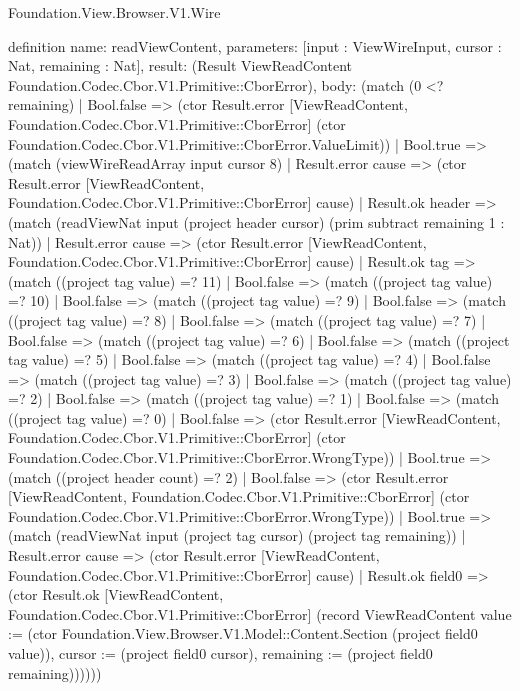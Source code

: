 \begin{lexlean}{Foundation.View.Browser.V1.Wire}
\begin{semanticmodule}
definition{
  name: readViewContent,
  parameters: [input : ViewWireInput, cursor : Nat, remaining : Nat],
  result: (Result ViewReadContent Foundation.Codec.Cbor.V1.Primitive::CborError),
  body: (match (0 <? remaining)
    | Bool.false => (ctor Result.error [ViewReadContent, Foundation.Codec.Cbor.V1.Primitive::CborError] (ctor Foundation.Codec.Cbor.V1.Primitive::CborError.ValueLimit))
    | Bool.true => (match (viewWireReadArray input cursor 8)
      | Result.error cause => (ctor Result.error [ViewReadContent, Foundation.Codec.Cbor.V1.Primitive::CborError] cause)
      | Result.ok header => (match (readViewNat input (project header cursor) (prim subtract remaining 1 : Nat))
        | Result.error cause => (ctor Result.error [ViewReadContent, Foundation.Codec.Cbor.V1.Primitive::CborError] cause)
        | Result.ok tag => (match ((project tag value) =? 11)
          | Bool.false => (match ((project tag value) =? 10)
            | Bool.false => (match ((project tag value) =? 9)
              | Bool.false => (match ((project tag value) =? 8)
                | Bool.false => (match ((project tag value) =? 7)
                  | Bool.false => (match ((project tag value) =? 6)
                    | Bool.false => (match ((project tag value) =? 5)
                      | Bool.false => (match ((project tag value) =? 4)
                        | Bool.false => (match ((project tag value) =? 3)
                          | Bool.false => (match ((project tag value) =? 2)
                            | Bool.false => (match ((project tag value) =? 1)
                              | Bool.false => (match ((project tag value) =? 0)
                                | Bool.false => (ctor Result.error [ViewReadContent, Foundation.Codec.Cbor.V1.Primitive::CborError] (ctor Foundation.Codec.Cbor.V1.Primitive::CborError.WrongType))
                                | Bool.true => (match ((project header count) =? 2)
                                  | Bool.false => (ctor Result.error [ViewReadContent, Foundation.Codec.Cbor.V1.Primitive::CborError] (ctor Foundation.Codec.Cbor.V1.Primitive::CborError.WrongType))
                                  | Bool.true => (match (readViewNat input (project tag cursor) (project tag remaining))
                                    | Result.error cause => (ctor Result.error [ViewReadContent, Foundation.Codec.Cbor.V1.Primitive::CborError] cause)
                                    | Result.ok field0 => (ctor Result.ok [ViewReadContent, Foundation.Codec.Cbor.V1.Primitive::CborError] (record ViewReadContent {value := (ctor Foundation.View.Browser.V1.Model::Content.Section (project field0 value)), cursor := (project field0 cursor), remaining := (project field0 remaining)})))))
}
\end{semanticmodule}
\end{lexlean}
